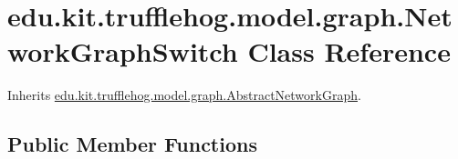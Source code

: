 \hypertarget{classedu_1_1kit_1_1trufflehog_1_1model_1_1graph_1_1_network_graph_switch}{}\section{edu.\+kit.\+trufflehog.\+model.\+graph.\+Network\+Graph\+Switch Class Reference}
\label{classedu_1_1kit_1_1trufflehog_1_1model_1_1graph_1_1_network_graph_switch}


Inherits \hyperlink{classedu_1_1kit_1_1trufflehog_1_1model_1_1graph_1_1_abstract_network_graph}{edu.\+kit.\+trufflehog.\+model.\+graph.\+Abstract\+Network\+Graph}.

\subsection*{Public Member Functions}
